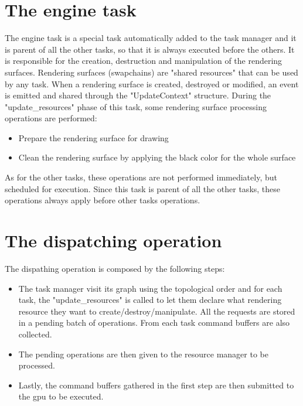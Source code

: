 \section{The engine task}
The engine task is a special task automatically added to the task manager and it is parent of all the other tasks, so that it is always executed before the others. It is responsible for the creation, destruction and manipulation of the rendering surfaces. Rendering surfaces (swapchains) are "shared resources" that can be used by any task. When a rendering surface is created, destroyed or modified, an event is emitted and shared through the "UpdateContext" structure. During the "update\_resources" phase of this task, some rendering surface processing operations are performed:
\begin{itemize}
	\item Prepare the rendering surface for drawing
	\item Clean the rendering surface by applying the black color for the whole surface
\end{itemize}
As for the other tasks, these operations are not performed immediately, but scheduled for execution. Since this task is parent of all the other tasks, these operations always apply before other tasks operations.
\newpage
\section{The dispatching operation}
The dispathing operation is composed by the following steps:
\begin{itemize}
	\item The task manager visit its graph using the topological order and for each task, the "update\_resources" is called to let them declare what rendering resource they want to create/destroy/manipulate. All the requests are stored in a pending batch of operations. From each task command buffers are also collected.
	\item The pending operations are then given to the resource manager to be processed. 
	\item Lastly, the command buffers gathered in the first step are then submitted to the gpu to be executed.
\end{itemize}